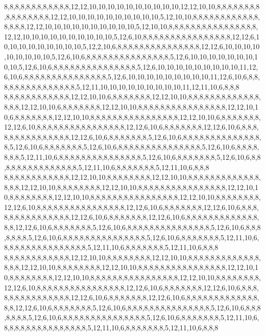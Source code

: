 8,8,8,8,8,8,8,8,8,8,8,8,12,12,10,10,10,10,10,10,10,10,10,10,12,12,10,10,8,8,8,8,8,8,8,8,8,8,8,8,8,8,8,8,12,12,10,10,10,10,10,10,10,10,10,10,5,12,10,10,8,8,8,8,8,8,8,8,8,8,8,8,8,8,8,8,12,12,10,10,10,10,10,10,10,10,10,10,5,12,10,10,8,8,8,8,8,8,8,8,8,8,8,8,8,8,8,8,12,12,10,10,10,10,10,10,10,10,10,10,5,12,6,10,8,8,8,8,8,8,8,8,8,8,8,8,8,8,8,8,12,12,6,10,10,10,10,10,10,10,10,10,5,12,2,10,6,8,8,8,8,8,8,8,8,8,8,8,8,8,8,8,12,12,6,10,10,10,10,10,10,10,10,10,5,12,6,10,6,8,8,8,8,8,8,8,8,8,8,8,8,8,8,8,5,12,6,10,10,10,10,10,10,10,10,10,5,12,6,10,6,8,8,8,8,8,8,8,8,8,8,8,8,8,8,8,5,12,6,10,10,10,10,10,10,10,10,10,11,12,6,10,6,8,8,8,8,8,8,8,8,8,8,8,8,8,8,8,5,12,6,10,10,10,10,10,10,10,10,10,11,12,6,10,6,8,8,8,8,8,8,8,8,8,8,8,8,8,8,8,5,12,11,10,10,10,10,10,10,10,10,10,11,12,11,10,6,8,8,8
8,8,8,8,8,8,8,8,8,8,8,8,12,12,10,10,6,8,8,8,8,8,8,8,12,12,10,10,8,8,8,8,8,8,8,8,8,8,8,8,8,8,8,8,12,12,10,10,6,8,8,8,8,8,8,8,12,12,10,10,8,8,8,8,8,8,8,8,8,8,8,8,8,8,8,8,12,12,10,10,6,8,8,8,8,8,8,8,12,12,10,10,8,8,8,8,8,8,8,8,8,8,8,8,8,8,8,8,12,12,10,10,6,8,8,8,8,8,8,8,12,12,6,10,8,8,8,8,8,8,8,8,8,8,8,8,8,8,8,8,12,12,6,10,6,8,8,8,8,8,8,8,12,12,6,10,6,8,8,8,8,8,8,8,8,8,8,8,8,8,8,8,12,12,6,10,6,8,8,8,8,8,8,8,5,12,6,10,6,8,8,8,8,8,8,8,8,8,8,8,8,8,8,8,5,12,6,10,6,8,8,8,8,8,8,8,5,12,6,10,6,8,8,8,8,8,8,8,8,8,8,8,8,8,8,8,5,12,6,10,6,8,8,8,8,8,8,8,5,12,11,10,6,8,8,8,8,8,8,8,8,8,8,8,8,8,8,8,5,12,6,10,6,8,8,8,8,8,8,8,5,12,6,10,6,8,8,8,8,8,8,8,8,8,8,8,8,8,8,8,5,12,11,10,6,8,8,8,8,8,8,8,5,12,11,10,6,8,8,8
8,8,8,8,8,8,8,8,8,8,8,8,12,12,10,10,8,8,8,8,8,8,8,8,12,12,10,10,8,8,8,8,8,8,8,8,8,8,8,8,8,8,8,8,12,12,10,10,8,8,8,8,8,8,8,8,12,12,10,10,8,8,8,8,8,8,8,8,8,8,8,8,8,8,8,8,12,12,10,10,8,8,8,8,8,8,8,8,12,12,10,10,8,8,8,8,8,8,8,8,8,8,8,8,8,8,8,8,12,12,10,10,8,8,8,8,8,8,8,8,12,12,6,10,8,8,8,8,8,8,8,8,8,8,8,8,8,8,8,8,12,12,6,10,6,8,8,8,8,8,8,8,12,12,6,10,6,8,8,8,8,8,8,8,8,8,8,8,8,8,8,8,12,12,6,10,6,8,8,8,8,8,8,8,12,12,6,10,6,8,8,8,8,8,8,8,8,8,8,8,8,8,8,8,12,12,6,10,6,8,8,8,8,8,8,8,5,12,6,10,6,8,8,8,8,8,8,8,8,8,8,8,8,8,8,8,5,12,6,10,6,8,8,8,8,8,8,8,5,12,6,10,6,8,8,8,8,8,8,8,8,8,8,8,8,8,8,8,5,12,6,10,6,8,8,8,8,8,8,8,5,12,11,10,6,8,8,8,8,8,8,8,8,8,8,8,8,8,8,8,5,12,11,10,6,8,8,8,8,8,8,8,5,12,11,10,6,8,8,8
8,8,8,8,8,8,8,8,8,8,8,8,12,12,10,10,8,8,8,8,8,8,8,8,12,12,10,10,8,8,8,8,8,8,8,8,8,8,8,8,8,8,8,8,12,12,10,10,8,8,8,8,8,8,8,8,12,12,10,10,8,8,8,8,8,8,8,8,8,8,8,8,8,8,8,8,12,12,10,10,8,8,8,8,8,8,8,8,12,12,10,10,8,8,8,8,8,8,8,8,8,8,8,8,8,8,8,8,12,12,10,10,8,8,8,8,8,8,8,8,12,12,6,10,8,8,8,8,8,8,8,8,8,8,8,8,8,8,8,8,12,12,6,10,6,8,8,8,8,8,8,8,12,12,6,10,6,8,8,8,8,8,8,8,8,8,8,8,8,8,8,8,12,12,6,10,6,8,8,8,8,8,8,8,12,12,6,10,6,8,8,8,8,8,8,8,8,8,8,8,8,8,8,8,12,12,6,10,6,8,8,8,8,8,8,8,5,12,6,10,6,8,8,8,8,8,8,8,8,8,8,8,8,8,8,8,5,12,6,10,6,8,8,8,8,8,8,8,5,12,6,10,6,8,8,8,8,8,8,8,8,8,8,8,8,8,8,8,5,12,6,10,6,8,8,8,8,8,8,8,5,12,11,10,6,8,8,8,8,8,8,8,8,8,8,8,8,8,8,8,5,12,11,10,6,8,8,8,8,8,8,8,5,12,11,10,6,8,8,8
